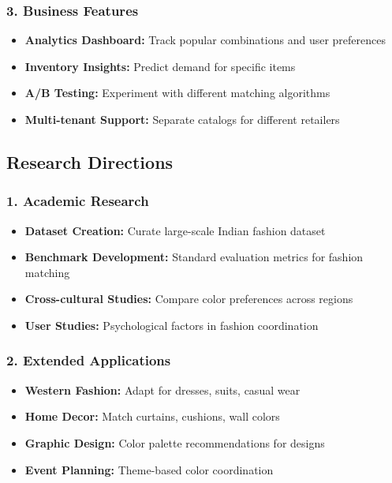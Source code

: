 \documentclass[12pt,a4paper]{report}
\begin{document}
\subsubsection{3. Business Features}
\begin{itemize}
    \item \textbf{Analytics Dashboard:} Track popular combinations and user preferences
    \item \textbf{Inventory Insights:} Predict demand for specific items
    \item \textbf{A/B Testing:} Experiment with different matching algorithms
    \item \textbf{Multi-tenant Support:} Separate catalogs for different retailers
\end{itemize}

\subsection{Research Directions}

\subsubsection{1. Academic Research}
\begin{itemize}
    \item \textbf{Dataset Creation:} Curate large-scale Indian fashion dataset
    \item \textbf{Benchmark Development:} Standard evaluation metrics for fashion matching
    \item \textbf{Cross-cultural Studies:} Compare color preferences across regions
    \item \textbf{User Studies:} Psychological factors in fashion coordination
\end{itemize}

\subsubsection{2. Extended Applications}
\begin{itemize}
    \item \textbf{Western Fashion:} Adapt for dresses, suits, casual wear
    \item \textbf{Home Decor:} Match curtains, cushions, wall colors
    \item \textbf{Graphic Design:} Color palette recommendations for designs
    \item \textbf{Event Planning:} Theme-based color coordination
\end{itemize}
\end{document}
